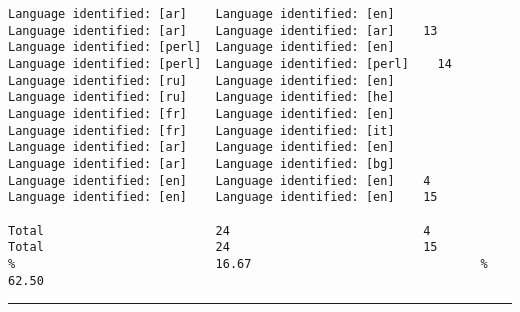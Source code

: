 \begin{verbatim}
Language identified: [ar]    Language identified: [en]            Language identified: [ar]    Language identified: [ar]    13
Language identified: [perl]  Language identified: [en]            Language identified: [perl]  Language identified: [perl]    14
Language identified: [ru]    Language identified: [en]            Language identified: [ru]    Language identified: [he]
Language identified: [fr]    Language identified: [en]            Language identified: [fr]    Language identified: [it]
Language identified: [ar]    Language identified: [en]            Language identified: [ar]    Language identified: [bg]
Language identified: [en]    Language identified: [en]    4       Language identified: [en]    Language identified: [en]    15

Total                        24                           4       Total                        24                           15
%                            16.67                                %                            62.50
\end{verbatim}
\vskip4pt\hrule

